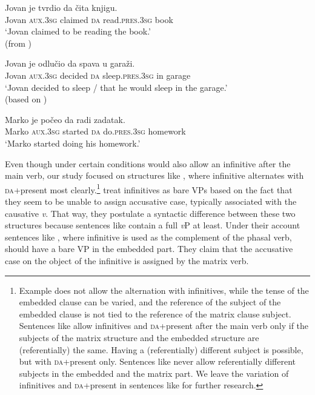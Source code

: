\documentclass[output=paper,
modfonts,
newtxmath,
hidelinks,
]{langscibook}
\begin{document}
\ea \label{ex8}
\gll { }Jovan je tvrdio da čita knjigu.\\
     { }Jovan \textsc{aux.3sg} claimed \textsc{da} read.\textsc{pres.3sg} book\\
\glt { }`Jovan claimed to be reading the book.'\\\hfill (from \citealt{TodorovicWurmbrand2015})
\z

\ea \label{ex9}
\gll { }Jovan je odlučio da spava u garaži.\\
     { }Jovan \textsc{aux.3sg} decided \textsc{da} sleep.\textsc{pres.3sg} in garage\\
\glt { }`Jovan decided to sleep / that he would sleep in the garage.'\\
\hfill (based on \citealt{TodorovicWurmbrand2015})
\z

\ea \label{ex10}
\gll { }Marko je počeo da radi zadatak.\\
     { }Marko \textsc{aux.3sg} started \textsc{da} do.\textsc{pres.3sg} homework\\
\glt { }`Marko started doing his homework.'
\z

\noindent Even though under certain conditions  would also allow an infinitive after the main verb, our study focused on structures like , where infinitive alternates with 
\textsc{da}+present most clearly.\footnote{\label{fn3}Example  does not allow the alternation with infinitives, while the tense of the embedded clause can be varied, and the reference of the subject of the embedded clause is not tied to the reference of the matrix clause subject. Sentences like  allow infinitives and \textsc{da}+present after the main verb only if the subjects of the matrix structure and the embedded structure are (referentially) the same. Having a (referentially) different subject is possible, but with \textsc{da}+present only. Sentences like  never allow referentially different subjects in the embedded and the matrix part. We leave the variation of infinitives and \textsc{da}+present in sentences like  for further research.} \citet{TodorovicWurmbrand2015} treat infinitives as bare VPs based on the fact that they seem to be unable to assign accusative case, typically associated with the causative \textit{v}. That way, they postulate a syntactic difference between these two structures because sentences like  contain a full \textit{v}P at least. Under their account sentences like , where infinitive is used as the complement of the phasal verb, should have a bare VP in the embedded part. They claim that the accusative case on the object of the infinitive is assigned by the matrix verb. 
\end{document}
